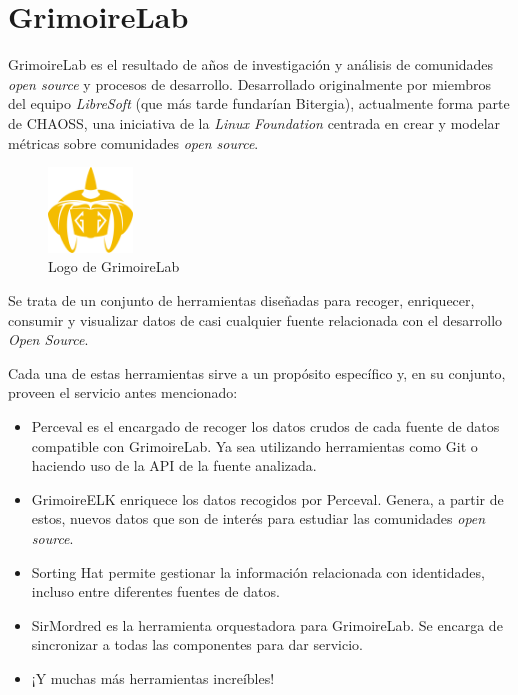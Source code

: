 
\section{GrimoireLab}\label{sec:grimoirelab}

GrimoireLab es el resultado de años de investigación y análisis de comunidades \emph{open source} y procesos de desarrollo. Desarrollado originalmente por miembros del equipo \emph{LibreSoft} (que más tarde fundarían Bitergia), actualmente forma parte de CHAOSS, una iniciativa de la \emph{Linux Foundation} centrada en crear y modelar métricas sobre comunidades \emph{open source}. \emph{\parencite{Reference12}}

\begin{figure}[ht]
    \centering
    \includegraphics[width=0.2\textwidth]{Figures/grimoirelab-logo}
    \decoRule
    \caption[GrimoireLab (Logo)]{Logo de GrimoireLab \emph{\parencite{Reference12}}}
    \label{fig:grimoirelab-logo}
\end{figure}

Se trata de un conjunto de herramientas diseñadas para recoger, enriquecer, consumir y visualizar datos de casi cualquier fuente relacionada con el desarrollo \emph{Open Source}.

Cada una de estas herramientas sirve a un propósito específico y, en su conjunto, proveen el servicio antes mencionado:

\begin{itemize}
    \item Perceval es el encargado de recoger los datos crudos de cada fuente de datos compatible con GrimoireLab. Ya sea utilizando herramientas como Git o haciendo uso de la API de la fuente analizada.
    \item GrimoireELK enriquece los datos recogidos por Perceval. Genera, a partir de estos, nuevos datos que son de interés para estudiar las comunidades \emph{open source}.
    \item Sorting Hat permite gestionar la información relacionada con identidades, incluso entre diferentes fuentes de datos.
    \item SirMordred es la herramienta orquestadora para GrimoireLab. Se encarga de sincronizar a todas las componentes para dar servicio.
    \item ¡Y muchas más herramientas increíbles!
\end{itemize}

